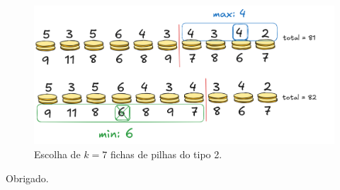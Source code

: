 \documentclass[12pt]{beamer}
\begin{document}
\begin{frame}
\begin{bloco}

\begin{figure}
    \centering
    \includegraphics[width=0.97\linewidth]{img/coins-greedy.png}
    \caption{Escolha de $k=7$ fichas de pilhas do tipo 2.}
    \label{fig:enter-label}
\end{figure}

\end{bloco}
\end{frame}

\begin{frame}

\centering
\Large Obrigado.

\end{frame}
\end{document}
